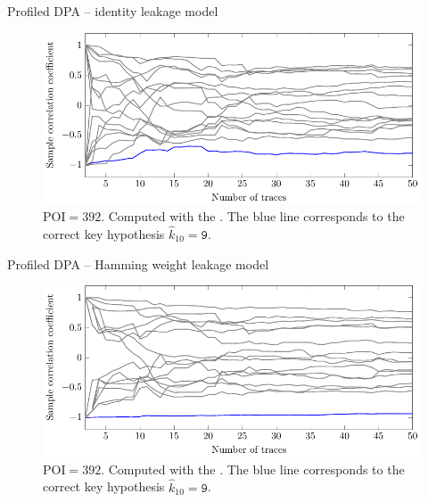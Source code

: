 \begin{frame}{Profiled DPA -- identity leakage model}
    \begin{figure}[h]
    \centering
    \includegraphics{fig/correlation_POI_identity.pdf}
    \caption{
    $\text{POI}=392$.
    Computed with the \dataranone.
    The blue line corresponds to the correct key hypothesis $\hat{k}_{10}=\texttt{9}$.}
\end{figure}
\end{frame}

\begin{frame}{Profiled DPA -- Hamming weight leakage model}
    \begin{figure}[h]
    \centering
    \includegraphics{fig/correlation_POI_hw.pdf}
    \caption{
    $\text{POI}=392$.
    Computed with the \dataranone.
    The blue line corresponds to the correct key hypothesis $\hat{k}_{10}=\texttt{9}$.}
\end{figure}
\end{frame}

